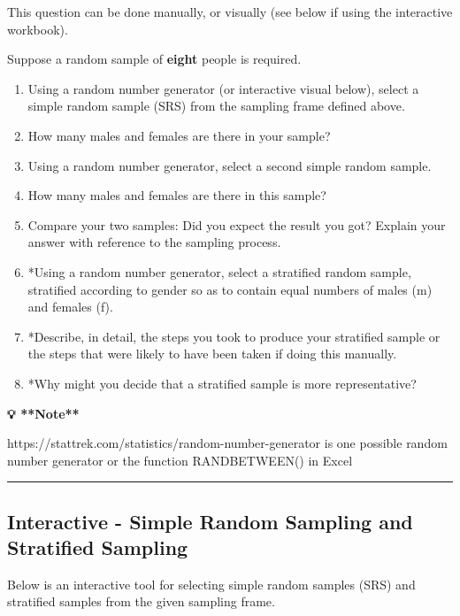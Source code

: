 \documentclass[
  11pt,
  oneside]{scrbook}
\begin{document}
This question can be done manually, or visually (see below if using the interactive workbook).

Suppose a random sample of \textbf{eight} people is required.

\begin{enumerate}
\def\labelenumi{(\alph{enumi})}
\item
  Using a random number generator (or interactive visual below), select a simple random sample (SRS) from the sampling frame defined above.
\item
  How many males and females are there in your sample?
\item
  Using a random number generator, select a second simple random sample.
\item
  How many males and females are there in this sample?
\item
  Compare your two samples: Did you expect the result you got? Explain your answer with reference to the sampling process.
\item
  *Using a random number generator, select a stratified random sample, stratified according to gender so as to contain equal numbers of males (m) and females (f).
\item
  *Describe, in detail, the steps you took to produce your stratified sample or the steps that were likely to have been taken if doing this manually.
\item
  *Why might you decide that a stratified sample is more representative?
\end{enumerate}

\begin{tipbox}
\textbf{💡 **Note**}

https://stattrek.com/statistics/random-number-generator is one possible random number generator or the function RANDBETWEEN() in Excel
\end{tipbox}

\begin{center}\rule{0.5\linewidth}{0.5pt}\end{center}

\subsection*{Interactive - Simple Random Sampling and Stratified Sampling}\label{interactive---simple-random-sampling-and-stratified-sampling}

Below is an interactive tool for selecting simple random samples (SRS) and stratified samples from the given sampling frame.
\end{document}
